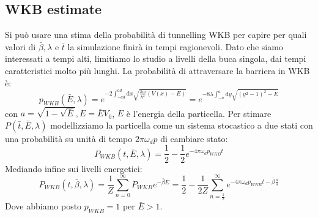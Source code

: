 \documentclass[italian]{article}
\newcommand{\dx}{\mathrm{d}x}
\newcommand{\dy}{\mathrm{d}y}
\begin{document}
	\subsection{WKB estimate}
	Si può usare una stima della probabilità di tunnelling WKB per capire per quali valori di $\bar{\beta}, \lambda$ e $\bar{t}$ la simulazione finirà in tempi ragionevoli.
	Dato che siamo interessati a tempi alti, limitiamo lo studio a livelli della buca singola, dai tempi caratteristici molto più lunghi.
	La probabilità di attraversare la barriera in WKB è:
	\begin{equation}
		p_{WKB}(\bar{E},\lambda)=e^{-2\int_{-ad}^{ad}\dx \sqrt{\frac{2m}{\hbar^2}(V(x)-E)}} =
		e^{-8\lambda\int_{-a}^{a} \dy \sqrt{\left(y^2 -1\right)^2 -\bar{E}}}
	\end{equation}
	con $a = \sqrt{1-\sqrt{\bar{E}}}, E = \bar{E}V_0$, $E$ è l'energia della particella. Per stimare $P(\bar{t},\bar{E}, \lambda)$ modellizziamo la particella come un sistema stocastico a due stati con una probabilità su unità di tempo $2\pi\omega_d p$ di cambiare stato:
	\begin{equation}
		P_{WKB}(t, \bar{E}, \lambda) = \frac{1}{2} - \frac{1}{2} e^{-4\pi\omega_d p_{WKB} t}
	\end{equation}
	Mediando infine sui livelli energetici:
	\begin{equation}
		P_{WKB}(t, \bar{\beta}, \lambda) = \frac{1}{Z} \sum_{n=0}^{\infty} P_{WKB} e^{-\bar{\beta}\bar{E}} =
\frac{1}{2} - \frac{1}{2Z} \sum_{n=\frac{1}{2}}^{\infty}  e^{-4\pi\omega_d p_{WKB} t-\bar{\beta}\frac{n}{\lambda}}
	\end{equation}
	Dove abbiamo posto $p_{WKB} = 1$ per $\bar{E} > 1$.
\end{document}
